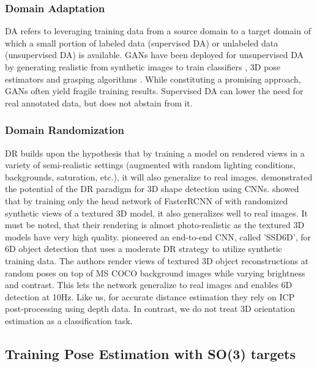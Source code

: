\subsubsection{Domain Adaptation} \gls{DA} \citep{csurka2017domain} refers to leveraging training data from a source domain to a target domain of which a small portion of labeled data (supervised \gls{DA}) or unlabeled data (unsupervised \gls{DA}) is available. \glspl{GAN} have been deployed for unsupervised \gls{DA} by generating realistic from synthetic images to train classifiers \citep{shrivastava2017learning}, 3D pose estimators \citep{bousmalis2017unsupervised} and grasping algorithms \citep{bousmalis2017using}. While constituting a promising approach, \glspl{GAN} often yield fragile training results. 
Supervised \gls{DA} can lower the need for real annotated data, but does not abstain from it. 

\subsubsection{Domain Randomization} \gls{DR} builds upon the hypothesis that by training a model on rendered views in a variety of semi-realistic settings (augmented with random lighting conditions, backgrounds, saturation, etc.), it will also generalize to real images. \cite{tobin2017domain} demonstrated the potential of the \gls{DR} paradigm for 3D shape detection using \glspl{CNN}. \cite{hinterstoisser2017pre} showed that by training only the head network of FasterRCNN of \cite{ren2015faster} with randomized synthetic views of a textured 3D model, it also generalizes well to real images. It must be noted, that their rendering is almost photo-realistic as the textured 3D models have very high quality. \cite{kehl2017ssd} pioneered an end-to-end \gls{CNN}, called 'SSD6D', for 6D object detection that uses a moderate \gls{DR} strategy to utilize synthetic training data. The authors render views of textured 3D object reconstructions at random poses on top of MS COCO background images \citep{lin2014microsoft} while varying brightness and contrast. This lets the network generalize to real images and enables 6D detection at 10Hz. Like us, for accurate distance estimation they rely on \gls{ICP} post-processing using depth data. In contrast, we do not treat 3D orientation estimation as a classification task.

\subsection{Training Pose Estimation with SO(3) targets}

